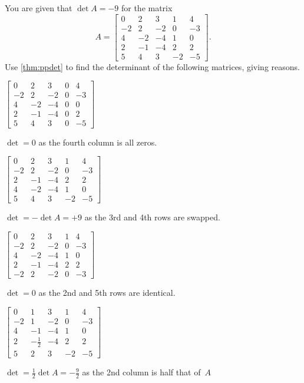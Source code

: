 \begin{example} \label{eg:}
You are given that \(\det A=-9\) for the matrix
\begin{equation*}
A=\begin{bmatrix}0&2&3&1&4
\\-2&2&-2&0&-3
\\4&-2&-4&1&0
\\2&-1&-4&2&2
\\5&4&3&-2&-5\end{bmatrix}.
\end{equation*}
Use \autoref{thm:ppdet} to find the determinant of the following matrices, giving reasons. 
\begin{parts}
\item \(\begin{bmatrix}0&2&3&0&4
\\-2&2&-2&0&-3
\\4&-2&-4&0&0
\\2&-1&-4&0&2
\\5&4&3&0&-5\end{bmatrix}\)
\begin{solution} 
\(\det=0\) as the fourth column is all zeros. 
\end{solution}

\item \(\begin{bmatrix}0&2&3&1&4
\\-2&2&-2&0&-3
\\2&-1&-4&2&2
\\4&-2&-4&1&0
\\5&4&3&-2&-5\end{bmatrix}\)
\begin{solution} 
\(\det=-\det A=+9\) as the 3rd and 4th rows are swapped. 
\end{solution}

\item \(\begin{bmatrix}0&2&3&1&4
\\-2&2&-2&0&-3
\\4&-2&-4&1&0
\\2&-1&-4&2&2
\\-2&2&-2&0&-3\end{bmatrix}\)
\begin{solution} 
\(\det=0\) as the 2nd and 5th rows are identical. 
\end{solution}

\item \(\begin{bmatrix}0&1&3&1&4
\\-2&1&-2&0&-3
\\4&-1&-4&1&0
\\2&-\frac12&-4&2&2
\\5&2&3&-2&-5\end{bmatrix}\)
\begin{solution} 
\(\det=\frac12\det A=-\frac92\) as the 2nd column is half that of~\(A\) 
\end{solution}


\end{parts}
\end{example}
